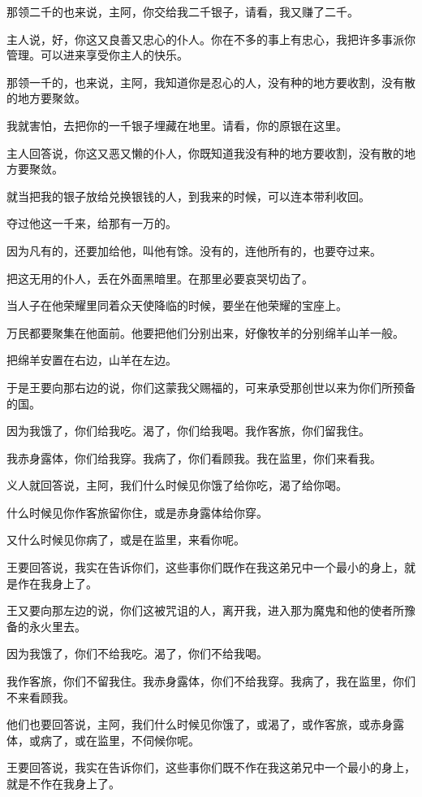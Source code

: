 \documentclass[12pt,oneside]{book}
\begin{document}
那领二千的也来说，主阿，你交给我二千银子，请看，我又赚了二千。

主人说，好，你这又良善又忠心的仆人。你在不多的事上有忠心，我把许多事派你管理。可以进来享受你主人的快乐。

那领一千的，也来说，主阿，我知道你是忍心的人，没有种的地方要收割，没有散的地方要聚敛。

我就害怕，去把你的一千银子埋藏在地里。请看，你的原银在这里。

主人回答说，你这又恶又懒的仆人，你既知道我没有种的地方要收割，没有散的地方要聚敛。

就当把我的银子放给兑换银钱的人，到我来的时候，可以连本带利收回。

夺过他这一千来，给那有一万的。

因为凡有的，还要加给他，叫他有馀。没有的，连他所有的，也要夺过来。

把这无用的仆人，丢在外面黑暗里。在那里必要哀哭切齿了。

当人子在他荣耀里同着众天使降临的时候，要坐在他荣耀的宝座上。

万民都要聚集在他面前。他要把他们分别出来，好像牧羊的分别绵羊山羊一般。

把绵羊安置在右边，山羊在左边。

于是王要向那右边的说，你们这蒙我父赐福的，可来承受那创世以来为你们所预备的国。

因为我饿了，你们给我吃。渴了，你们给我喝。我作客旅，你们留我住。

我赤身露体，你们给我穿。我病了，你们看顾我。我在监里，你们来看我。

义人就回答说，主阿，我们什么时候见你饿了给你吃，渴了给你喝。

什么时候见你作客旅留你住，或是赤身露体给你穿。

又什么时候见你病了，或是在监里，来看你呢。

王要回答说，我实在告诉你们，这些事你们既作在我这弟兄中一个最小的身上，就是作在我身上了。

王又要向那左边的说，你们这被咒诅的人，离开我，进入那为魔鬼和他的使者所豫备的永火里去。

因为我饿了，你们不给我吃。渴了，你们不给我喝。

我作客旅，你们不留我住。我赤身露体，你们不给我穿。我病了，我在监里，你们不来看顾我。

他们也要回答说，主阿，我们什么时候见你饿了，或渴了，或作客旅，或赤身露体，或病了，或在监里，不伺候你呢。

王要回答说，我实在告诉你们，这些事你们既不作在我这弟兄中一个最小的身上，就是不作在我身上了。
\end{document}

